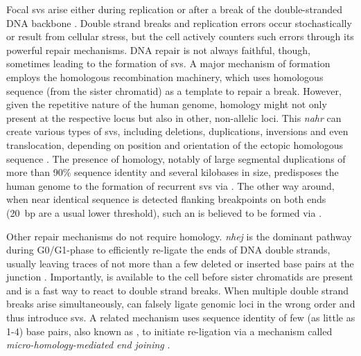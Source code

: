 Focal \acp{sv} arise either during replication or after a break of the
double-stranded DNA backbone \citep{Hastings2009}. Double strand breaks and
replication errors occur stochastically or result from cellular stress, but the
cell actively counters such errors through its powerful repair mechanisms. DNA
repair is not always faithful, though, sometimes leading to the formation of
\acp{sv}. A major mechanism of \sv formation employs the homologous
recombination machinery, which uses homologous sequence (from the sister
chromatid) as a template to repair a break. However, given the repetitive
nature of the human genome, homology might not only present at the
respective locus but also in other, non-allelic loci. This \emph{\acf{nahr}}
can create various types of \acp{sv}, including deletions, duplications,
inversions and even translocation, depending on position and orientation of the
ectopic homologous sequence \citep{Carvalho2016}. The presence of homology,
notably of large segmental duplications of more than 90\% sequence identity and
several kilobases in size, predisposes the human genome to the formation of
recurrent \acp{sv} via \nahr \citep{Carvalho2016}. The other way around, when
near identical sequence is detected flanking \sv breakpoints on both ends
(20~bp are a usual lower threshold), such an \sv is believed to be formed via
\nahr \citep{Onishi-Seebacher2011}.

Other repair mechanisms do not require homology. \emph{\Acf{nhej}} is the
dominant pathway during G0/G1-phase to efficiently re-ligate the ends of DNA
double strands, usually leaving traces of not more than a few deleted or
inserted base pairs at the junction \citep{Lieber2008}. Importantly, \nhej is
available to the cell before sister chromatids are present and is a fast way to
react to double strand breaks. When multiple double strand breaks arise
simultaneously, \nhej can falsely ligate genomic loci in the wrong order and
thus introduce \acp{sv}. A related mechanism uses sequence identity of few
(as little as 1-4) base pairs, also known as , to initiate re-ligation via a mechanism
called \emph{micro-homology-mediated end joining} \citep{Hastings2009}.

